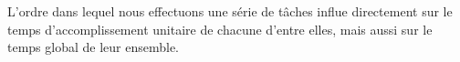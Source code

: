 %
    {L’ordre dans lequel nous effectuons une série de tâches influe directement sur le temps d’accomplissement unitaire de chacune d’entre elles, mais aussi sur le temps global de leur ensemble.}%
    {}
